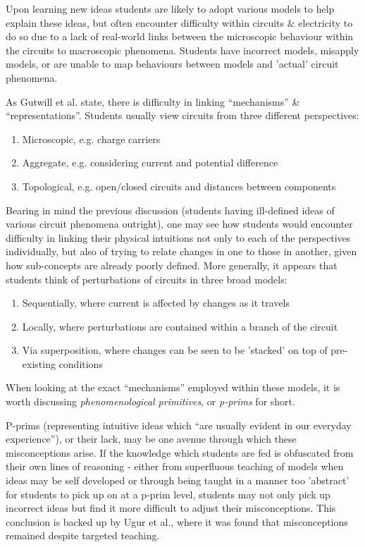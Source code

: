 \documentclass[a4paper,openany,nobib]{tufte-book}
\begin{document}
Upon learning new ideas students are likely to adopt various models to help explain these {ideas\autocite{bagno2000}}, but often encounter difficulty within circuits \& electricity to do so due to a lack of real-world links between the microscopic behaviour within the circuits to macroscopic phenomena. Students have incorrect models, misapply models, or are unable to map behaviours between models and 'actual' circuit phenomena.

As Gutwill et al. state, there is difficulty in linking ``mechanisms'' \& {``representations''\autocite{gutwill99}}.
Students usually view circuits from three different perspectives:
\begin{enumerate}
	\item Microscopic, e.g. charge carriers
	\item Aggregate, e.g. considering current and potential difference
	\item Topological, e.g. open/closed circuits and distances between components
\end{enumerate}
Bearing in mind the previous discussion (students having ill-defined ideas of various circuit phenomena outright), one may see how students would encounter difficulty in linking their physical intuitions not only to each of the perspectives individually, but also of trying to relate changes in one to those in another, given how sub-concepts are already poorly defined. More generally, it appears that students think of perturbations of circuits in three broad {models\autocite{ates2005}}:
\begin{enumerate}
	\item Sequentially, where current is affected by changes as it travels
	\item Locally, where perturbations are contained within a branch of the circuit
	\item Via superposition, where changes can be seen to be 'stacked' on top of pre-existing conditions
\end{enumerate}
When looking at the exact ``mechanisms'' employed within these models, it is worth discussing \emph{phenomenological primitives}, or \emph{p-prims} for {short\autocite{prim}}. 

P-prims (representing intuitive ideas which ``are usually evident in our everyday experience''), or their lack, may be one avenue through which these misconceptions arise. If the knowledge which students are fed is obfuscated from their own lines of reasoning - either from superfluous teaching of models when ideas may be self developed or through being taught in a manner too 'abstract' for students to pick up on at a p-prim level, students may not only pick up incorrect ideas but find it more difficult to adjust their misconceptions. 
This conclusion is backed up by Ugur et {al.\autocite{ugur}}, where it was found that misconceptions remained despite targeted teaching.
\end{document}
